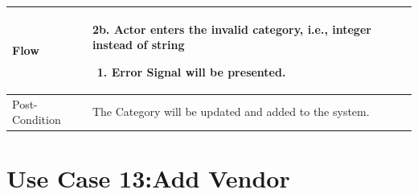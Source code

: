 \documentclass[12pt,a4paper]{report}
\begin{document}
\begin{tabular}{ | m{3cm} | m{12cm}| } \hline
Flow & 2b. Actor enters the invalid category, i.e., integer instead of string
	\begin{enumerate}
		\item Error Signal will be presented.
	\end{enumerate}
\\ \hline
Post-Condition &    The Category will be updated and added to the system. \\ \hline

\end{tabular}

\section{Use Case 13:Add Vendor}
\end{document}
